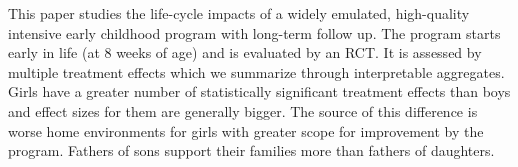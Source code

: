 \noindent This paper studies the life-cycle impacts of a widely emulated, high-quality intensive early childhood program with long-term follow up. The program starts early in life (at 8 weeks of age) and is evaluated by an RCT. It is assessed by multiple treatment effects which we summarize through interpretable aggregates. Girls have a greater number of statistically significant treatment effects than boys and effect sizes for them are generally bigger. The source of this difference is worse home environments for girls with greater scope for improvement by the program. Fathers of sons support their families more than fathers of daughters.
